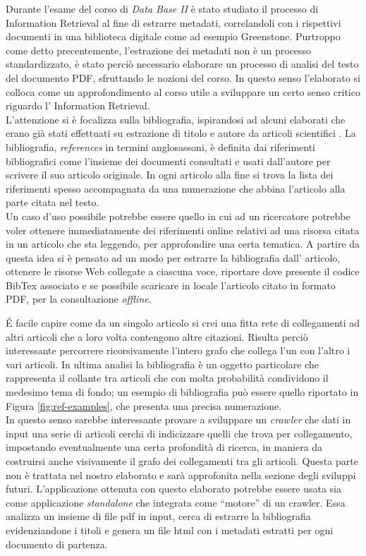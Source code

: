 Durante l'esame del corso di \textit{Data Base II} è stato studiato il processo di Information Retrieval al fine di estrarre metadati, correlandoli con i rispettivi documenti in una biblioteca digitale come ad esempio Greenstone. Purtroppo come detto precentemente, l'estrazione dei metadati non è un processo standardizzato, è stato perciò necessario elaborare un processo di analisi del testo del documento PDF, sfruttando le nozioni del corso. In questo senso l'elaborato si colloca come un approfondimento al corso utile a sviluppare un certo senso critico riguardo l' Information Retrieval.\\
L'attenzione si è focalizza sulla bibliografia, ispirandosi ad alcuni elaborati che erano già stati effettuati su estrazione di titolo e autore da articoli scientifici \cite{Tarocchi}. La bibliografia, \textit{references} in  termini anglosassoni, è definita dai riferimenti bibliografici come l'insieme dei documenti consultati e usati dall'autore per scrivere il suo articolo originale. In ogni articolo alla fine si trova la lista dei riferimenti spesso accompagnata da una numerazione che abbina l'articolo alla parte citata nel testo.
\\ 
Un caso d'uso possibile potrebbe essere quello in cui ad un ricercatore potrebbe voler ottenere immediatamente dei riferimenti online relativi ad una risorsa citata in un articolo che sta leggendo, per approfondire una certa tematica. A partire da questa idea si è pensato ad un modo per estrarre la bibliografia dall' articolo, ottenere le risorse Web collegate a ciascuna voce, riportare dove presente il codice BibTex associato e se possibile scaricare in locale l'articolo citato in formato PDF, per la consultazione \textit{offline}.

\'E facile capire come da un singolo articolo si crei una fitta rete di collegamenti ad altri articoli che a loro volta contengono altre citazioni. Risulta perciò interessante percorrere ricorsivamente l'intero grafo che collega l'un con l'altro i vari articoli. In ultima analisi la bibliografia è un oggetto particolare che rappresenta il collante tra articoli che con molta probabilità condividono il medesimo tema di fondo; un esempio di bibliografia può essere quello riportato in Figura \ref{fig:ref-examples}, che presenta una precisa numerazione.
\\
In questo senso sarebbe interessante provare a sviluppare un \textit{crawler} che dati in input una serie di articoli cerchi di indicizzare quelli che trova per collegamento, impostando eventualmente una certa profondità di ricerca, in maniera da costruirsi anche visivamente il grafo dei collegamenti tra gli articoli. Questa parte non è trattata nel nostro elaborato e sarà approfonita nella sezione degli sviluppi futuri. L'applicazione ottenuta con questo elaborato potrebbe essere usata sia come applicazione \textit{standalone} che integrata come ``motore'' di un crawler. Essa analizza un insieme di file pdf in input, cerca di estrarre la bibliografia evidenziandone i titoli e genera un file html con i metadati estratti per ogni documento di partenza. 


